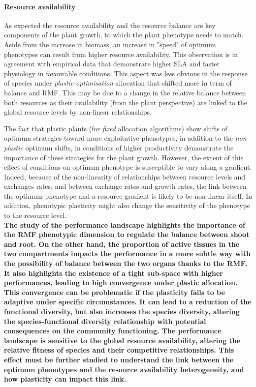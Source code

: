 \paragraph{Resource availability}

As expected the resource availability and the resource balance are key components of the plant growth, to which the plant phenotype needs to match. Aside from the increase in biomass, an increase in "speed" of optimum phenotypes can result from higher resource availability. This observation is in agreement with empirical data that demonstrate higher SLA and faster physiology in favourable conditions. This aspect was less obvious in the response of species under \textit{plastic-optimisation} allocation that shifted more in term of balance and RMF. This may be due to a change in the relative balance between both resources as their availability (from the plant perspective) are linked to the global resource levels by non-linear relationships.

The fact that plastic plants (for \textit{fixed} allocation algorithms) show shifts of optimum strategies toward more exploitative phenotypes, in addition to the \textit{non plastic} optimum shifts, in conditions of higher productivity demonstrate the importance of these strategies for the plant growth. However, the extent of this effect of conditions on optimum phenotype is susceptible to vary along a gradient. Indeed, because of the non-linearity of relationships between resource levels and exchanges rates, and between exchange rates and growth rates, the link between the optimum phenotype and a resource gradient is likely to be non-linear itself. In addition, phenotypic plasticity might also change the sensitivity of the phenotype to the resource level.\\


\textbf{The study of the performance landscape highlights the importance of the RMF phenotypic dimension to regulate the balance between shoot and root. On the other hand, the proportion of active tissues in the two compartments impacts the performance in a more subtle way with the possibility of balance between the two organs thanks to the RMF. It also highlights the existence of a tight sub-space with higher performances, leading to high convergence under plastic allocation. This convergence can be problematic if the plasticity fails to be adaptive under specific circumstances. It can lead to a reduction of the functional diversity, but also increases the species diversity, altering the species-functional diversity relationship with potential consequences on the community functioning. The performance landscape is sensitive to the global resource availability, altering the relative fitness of species and their competitive relationships. This effect must be further studied to understand the link between the optimum phenotypes and the resource availability heterogeneity, and how plasticity can impact this link. }

